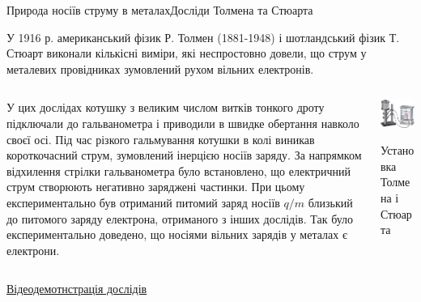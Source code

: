 \documentclass{beamer}
\begin{document}
\begin{frame}{Природа носіїв струму в металах}{Досліди Толмена та Стюарта}\scriptsize
	\begin{block}{}\justifying
		У 1916 р. американський фізик Р. Толмен (1881-1948) і шотландський фізик Т. Стюарт виконали
		кількісні виміри, які неспростовно довели, що струм у металевих провідниках зумовлений рухом
		вільних електронів.
	\end{block}
	\begin{columns}
		\begin{column}{0.65\linewidth}
			\begin{block}{}\justifying
				У цих дослідах котушку з великим числом витків тонкого дроту підключали до
				гальванометра і приводили в швидке обертання навколо своєї осі. Під час різкого
				гальмування котушки в колі виникав короткочасний струм, зумовлений інерцією носіїв
				заряду. За напрямком відхилення стрілки гальванометра було встановлено, що
				\alert{електричний струм створюють негативно заряджені частинки}. При цьому
				експериментально був отриманий питомий заряд носіїв $q/m$ близький до питомого
				заряду електрона, отриманого з інших дослідів. Так було експериментально доведено,
				що носіями вільних зарядів у металах є електрони.
			\end{block}
		\end{column}
		\hfill
		\begin{column}{0.3\linewidth}\centering
			\includegraphics[width=\linewidth]{exptommstuart}
			\begin{block}{}\centering
				Установка Толмена і Стюарта
			\end{block}
		\end{column}
	\end{columns}
	\begin{block}{}
		\href{https://www.youtube.com/watch?v=nVwquffMk44}{\color{blue}Відеодемотнстрація дослідів}
	\end{block}
\end{frame}
\end{document}
